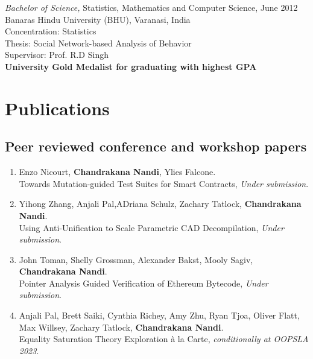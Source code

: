 \documentclass[margin, 10pt]{res} %
\begin{document}
\begin{resume}
{\sl Bachelor of Science,} Statistics, Mathematics and Computer Science, June 2012 \\
Banaras Hindu University (BHU), Varanasi, India \\
Concentration: Statistics \\
Thesis: Social Network-based Analysis of Behavior \\ Supervisor: Prof. R.D Singh\\
\textbf{University Gold Medalist for graduating with highest GPA}

\section{Publications}
\subsection{Peer reviewed conference and workshop papers}


\begin{enumerate}
  \item Enzo Nicourt, \textbf{Chandrakana Nandi}, Ylies Falcone. \\
    Towards Mutation-guided Test Suites for Smart Contracts, \textit{Under submission}.

  \item Yihong Zhang, Anjali Pal,ADriana Schulz, Zachary Tatlock, \textbf{Chandrakana Nandi}. \\
    Using Anti-Unification to Scale Parametric CAD Decompilation, \textit{Under submission}.

  \item John Toman, Shelly Grossman, Alexander Bakst, Mooly Sagiv, \textbf{Chandrakana Nandi}. \\
    Pointer Analysis Guided Verification of Ethereum Bytecode, \textit{Under submission}.

  \item Anjali Pal, Brett Saiki, Cynthia Richey, Amy Zhu, Ryan Tjoa, Oliver Flatt, Max Willsey, Zachary Tatlock, \textbf{Chandrakana Nandi}. \\
    Equality Saturation Theory Exploration à la Carte, \textit{conditionally at OOPSLA 2023}.


\end{enumerate}
\end{resume}
\end{document}
